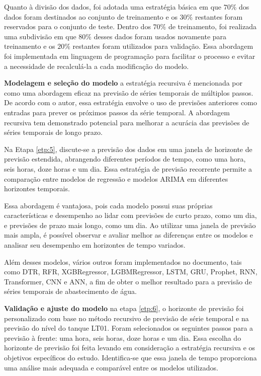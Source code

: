 Quanto à divisão dos dados, foi adotada uma estratégia básica em que $70\%$ dos dados foram destinados ao conjunto de treinamento e os $30\%$ restantes foram reservados para o conjunto de teste. Dentro dos $70\%$ de treinamento, foi realizada uma subdivisão em que $80\%$ desses dados foram usados novamente para treinamento e os $20\% $ restantes foram utilizados para validação. Essa abordagem foi implementada em linguagem de programação para facilitar o processo e evitar a necessidade de recalculá-la a cada modificação do modelo.

\textbf{Modelagem e sele\c c\~ao do modelo}
a estratégia recursiva é mencionada por  como uma abordagem eficaz na previsão de séries temporais de múltiplos passos. De acordo com o autor, essa estratégia envolve o uso de previsões anteriores como entradas para prever os próximos passos da série temporal. A abordagem recursiva tem demonstrado potencial para melhorar a acurácia das previsões de séries temporais de longo prazo.

Na Etapa \ref{etp:5}, discute-se a previsão dos dados em uma janela de horizonte de previsão estendida, abrangendo diferentes períodos de tempo, como uma hora, seis horas, doze horas e um dia. Essa estratégia de previsão recorrente permite a comparação entre modelos de regressão e modelos ARIMA em diferentes horizontes temporais.

Essa abordagem é vantajosa, pois cada modelo possui suas próprias características e desempenho ao lidar com previsões de curto prazo, como um dia, e previsões de prazo mais longo, como um dia. Ao utilizar uma janela de previsão mais ampla, é possível observar e avaliar melhor as diferenças entre os modelos e analisar seu desempenho em horizontes de tempo variados.

Além desses modelos, vários outros foram implementados no documento, tais como DTR, RFR, XGBRegressor, LGBMRegressor, LSTM, GRU, Prophet, RNN, Transformer, CNN e ANN, a fim de obter o melhor resultado para a previsão de séries temporais de abastecimento de água.

\textbf{Validação e ajuste do modelo}
na etapa \ref{etp:6}, o horizonte de previsão foi personalizado com base no método recursivo de previsão de série temporal e na previsão do nível do tanque LT01. Foram selecionados os seguintes passos para a previsão à frente: uma hora, seis horas, doze horas e um dia. Essa escolha do horizonte de previsão foi feita levando em consideração a estratégia recursiva e os objetivos específicos do estudo. Identifica-se que essa janela de tempo proporciona uma análise mais adequada e comparável entre os modelos utilizados.

